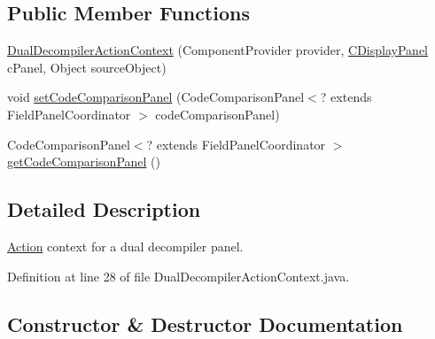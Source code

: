 \subsection*{Public Member Functions}
\begin{DoxyCompactItemize}
\item 
\mbox{\hyperlink{classghidra_1_1app_1_1decompiler_1_1component_1_1_dual_decompiler_action_context_a0997ba2e6dbdc992f590bf3335be4232}{Dual\+Decompiler\+Action\+Context}} (Component\+Provider provider, \mbox{\hyperlink{classghidra_1_1app_1_1decompiler_1_1component_1_1_c_display_panel}{C\+Display\+Panel}} c\+Panel, Object source\+Object)
\item 
void \mbox{\hyperlink{classghidra_1_1app_1_1decompiler_1_1component_1_1_dual_decompiler_action_context_a26c24ff804bd30e3f81b459dcb8fbe4d}{set\+Code\+Comparison\+Panel}} (Code\+Comparison\+Panel$<$? extends Field\+Panel\+Coordinator $>$ code\+Comparison\+Panel)
\item 
Code\+Comparison\+Panel$<$? extends Field\+Panel\+Coordinator $>$ \mbox{\hyperlink{classghidra_1_1app_1_1decompiler_1_1component_1_1_dual_decompiler_action_context_ac5b3336556c9a6d64a186fa3d59c0efd}{get\+Code\+Comparison\+Panel}} ()
\end{DoxyCompactItemize}


\subsection{Detailed Description}
\mbox{\hyperlink{class_action}{Action}} context for a dual decompiler panel. 

Definition at line 28 of file Dual\+Decompiler\+Action\+Context.\+java.



\subsection{Constructor \& Destructor Documentation}
\mbox{\label{classghidra_1_1app_1_1decompiler_1_1component_1_1_dual_decompiler_action_context_a0997ba2e6dbdc992f590bf3335be4232}} 
